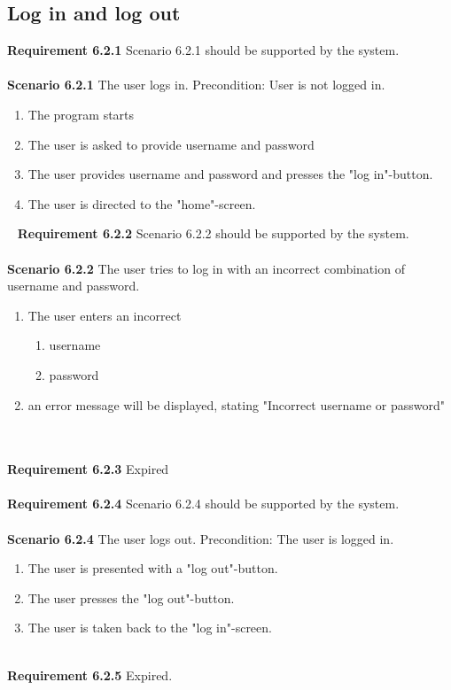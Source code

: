 \documentclass{article}
\begin{document}
\subsection{Log in and log out}
\textbf{Requirement 6.2.1} Scenario 6.2.1 should be supported by the system.
\\ \\
\textbf{Scenario 6.2.1} The user logs in. Precondition: User is not logged in. 
\begin{enumerate}
    \item The program starts
    \item The user is asked to provide username and password
    \item The user provides username and password and presses the "log in"-button.
    \item The user is directed to the "home"-screen.
\end{enumerate}
\mbox{}\
\textbf{Requirement 6.2.2} Scenario 6.2.2 should be supported by the system.
\\ \\
\textbf{Scenario 6.2.2} The user tries to log in with an incorrect combination of username and password.
\begin{enumerate}
    \item The user enters an incorrect
    \begin{enumerate}[label=(\alph*)]
        \item username
        \item password
    \end{enumerate}
    \item an error message will be displayed, stating "Incorrect username or password"
\end{enumerate}
\mbox{}\\ \\
\textbf{Requirement 6.2.3} Expired
\\ \\
\textbf{Requirement 6.2.4} Scenario 6.2.4 should be supported by the system.
\\ \\
\textbf{Scenario 6.2.4} The user logs out. Precondition: The user is logged in.
\begin{enumerate}
    \item The user is presented with a "log out"-button.
    \item The user presses the "log out"-button.
    \item The user is taken back to the "log in"-screen.
\end{enumerate}
\mbox{}\\
\textbf{Requirement 6.2.5} Expired.
\end{document}
